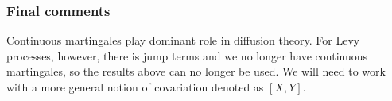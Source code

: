 \subsubsection{Final comments}

Continuous martingales play dominant role in diffusion theory. For Levy processes, however, there is jump terms and we no longer have continuous martingales, so the results above can no longer be used. We will need to work with a more general notion of covariation denoted as $[X,Y]$.

